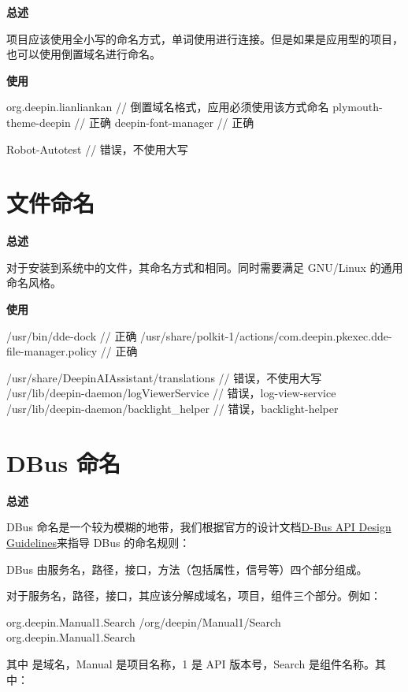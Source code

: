 \textbf{总述}

\deepin 项目应该使用全小写的命名方式，单词使用\cppinline{-}进行连接。但是如果是应用型的项目，也可以使用倒置域名进行命名。

\textbf{使用}

\begin{cppcode}
  org.deepin.lianliankan // 倒置域名格式，应用必须使用该方式命名
  plymouth-theme-deepin  // 正确
  deepin-font-manager    // 正确

  Robot-Autotest         // 错误，不使用大写
\end{cppcode}

\section{文件命名} \label{deepin-file-naming}

\textbf{总述}

对于安装到系统中的文件，其命名方式和相同。同时需要满足 GNU/Linux 的通用命名风格。

\textbf{使用}

\begin{cppcode}
  /usr/bin/dde-dock  // 正确
  /usr/share/polkit-1/actions/com.deepin.pkexec.dde-file-manager.policy  // 正确

  /usr/share/DeepinAIAssistant/translations  // 错误，不使用大写
  /usr/lib/deepin-daemon/logViewerService    // 错误，log-view-service
  /usr/lib/deepin-daemon/backlight_helper    // 错误，backlight-helper
\end{cppcode}

\section{DBus 命名}

\textbf{总述}

DBus 命名是一个较为模糊的地带，我们根据官方的设计文档\href{https://dbus.freedesktop.org/doc/dbus-api-design.html}{D-Bus API Design Guidelines}来指导 DBus 的命名规则：

DBus 由服务名，路径，接口，方法（包括属性，信号等）四个部分组成。

对于服务名，路径，接口，其应该分解成域名，项目，组件三个部分。例如：

\begin{cppcode}
  org.deepin.Manual1.Search
  /org/deepin/Manual1/Search
  org.deepin.Manual1.Search
\end{cppcode}

其中  是域名，Manual 是项目名称，1 是 API 版本号，Search 是组件名称。其中：

